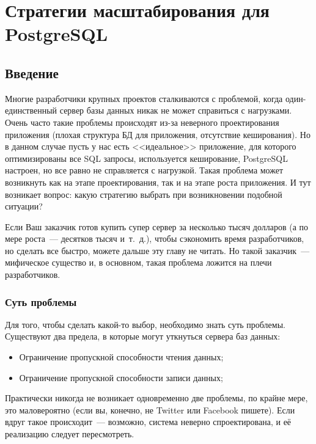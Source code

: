 \chapter{Стратегии масштабирования для PostgreSQL}

\begin{epigraphs}
\end{epigraphs}

\section{Введение}

Многие разработчики крупных проектов сталкиваются с проблемой, когда один-единственный сервер базы данных никак не может справиться с нагрузками. Очень часто такие проблемы происходят из-за неверного проектирования приложения (плохая структура БД для приложения, отсутствие кеширования). Но в данном случае пусть у нас есть <<идеальное>> приложение, для которого оптимизированы все SQL запросы, используется кеширование, PostgreSQL настроен, но все равно не справляется с нагрузкой. Такая проблема может возникнуть как на этапе проектирования, так и на этапе роста приложения. И тут возникает вопрос: какую стратегию выбрать при возникновении подобной ситуации?

Если Ваш заказчик готов купить супер сервер за несколько тысяч долларов (а по мере роста~--- десятков тысяч и~т.~д.), чтобы сэкономить время разработчиков, но сделать все быстро, можете дальше эту главу не читать. Но такой заказчик~--- мифическое существо и, в основном, такая проблема ложится на плечи разработчиков.

\subsection{Суть проблемы}

Для того, чтобы сделать какой-то выбор, необходимо знать суть проблемы. Существуют два предела, в которые могут уткнуться сервера баз данных:

\begin{itemize}
  \item Ограничение пропускной способности чтения данных;
  \item Ограничение пропускной способности записи данных;
\end{itemize}

Практически никогда не возникает одновременно две проблемы, по крайне мере, это маловероятно (если вы, конечно, не Twitter или Facebook пишете). Если вдруг такое происходит~--- возможно, система неверно спроектирована, и её реализацию следует пересмотреть.

